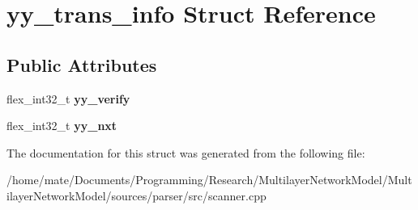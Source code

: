 \hypertarget{structyy__trans__info}{}\section{yy\+\_\+trans\+\_\+info Struct Reference}
\label{structyy__trans__info}
\subsection*{Public Attributes}
\begin{DoxyCompactItemize}
\item 
flex\+\_\+int32\+\_\+t {\bfseries yy\+\_\+verify}\hypertarget{structyy__trans__info_a5c9f61e770deef50bd4e697310342fe9}{}\label{structyy__trans__info_a5c9f61e770deef50bd4e697310342fe9}

\item 
flex\+\_\+int32\+\_\+t {\bfseries yy\+\_\+nxt}\hypertarget{structyy__trans__info_ae0715250c2bef261e596e77e0030f13e}{}\label{structyy__trans__info_ae0715250c2bef261e596e77e0030f13e}

\end{DoxyCompactItemize}


The documentation for this struct was generated from the following file\+:\begin{DoxyCompactItemize}
\item 
/home/mate/\+Documents/\+Programming/\+Research/\+Multilayer\+Network\+Model/\+Multilayer\+Network\+Model/sources/parser/src/scanner.\+cpp\end{DoxyCompactItemize}
